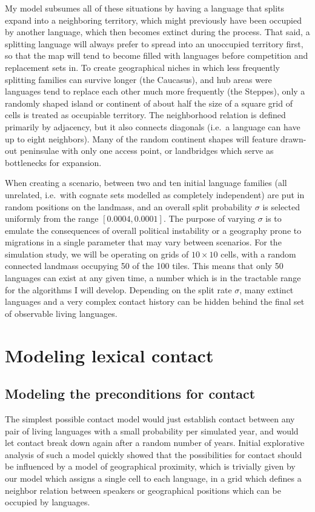 My model subsumes all of these situations by having a language that splits expand into a neighboring territory, which might previously have been occupied by another language, which then becomes extinct during the process. That said, a splitting language will always prefer to spread into an unoccupied territory first, so that the map will tend to become filled with languages before competition and replacement sets in. To create geographical niches in which less frequently splitting families can survive longer (the Caucasus), and hub areas were languages tend to replace each other much more frequently (the Steppes), only a randomly shaped island or continent of about half the size of a square grid of cells is treated as occupiable territory. The neighborhood relation is defined primarily by adjacency, but it also connects diagonals (i.e.\ a language can have up to eight neighbors). Many of the random continent shapes will feature drawn-out peninsulae with only one access point, or landbridges which serve as 
bottlenecks for expansion.

When creating a scenario, between two and ten initial language families (all unrelated, i.e.\ with cognate sets modelled as completely independent) are put in random positions on the landmass, and an overall split probability $\sigma$ is selected uniformly from the range $[0.0004,0.0001]$. The purpose of varying $\sigma$ is to emulate the consequences of overall political instability or a geography prone to migrations in a single parameter that may vary between scenarios. For the simulation study, we will be operating on grids of $10 \times 10$ cells, with a random connected landmass occupying 50 of the 100 tiles. This means that only 50 languages can exist at any given time, a number which is in the tractable range for the algorithms I will develop. Depending on the split rate $\sigma$, many extinct languages and a very complex contact history can be hidden behind the final set of observable living languages.

\section{Modeling lexical contact}

\subsection{Modeling the preconditions for contact}
The simplest possible contact model would just establish contact between any pair of living languages with a small probability per simulated year, and would let contact break down again after a random number of years. Initial explorative analysis of such a model quickly showed that the possibilities for contact should be influenced by a model of geographical proximity, which is trivially given by our model which assigns a single cell to each language, in a grid which defines a neighbor relation between speakers or geographical positions which can be occupied by languages.

